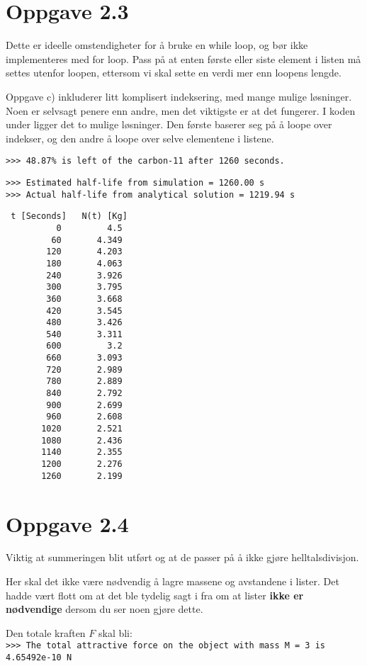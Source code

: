 \documentclass[10pt,a4paper]{article}
\begin{document}
\section*{Oppgave 2.3}

Dette er ideelle omstendigheter for å bruke en while loop, og bør ikke implementeres med for loop. Pass på at enten første eller siste element i listen må settes utenfor loopen, ettersom vi skal sette en verdi mer enn loopens lengde. 

Oppgave c) inkluderer litt komplisert indeksering, med mange mulige løsninger. Noen er selvsagt penere enn andre, men det viktigste er at det fungerer. I koden under ligger det to mulige løsninger. Den første baserer seg på å loope over indekser, og den andre å loope over selve elementene i listene.



\begin{verbatim}
>>> 48.87% is left of the carbon-11 after 1260 seconds.
\end{verbatim}

\begin{verbatim}
>>> Estimated half-life from simulation = 1260.00 s
>>> Actual half-life from analytical solution = 1219.94 s
\end{verbatim}


\begin{verbatim}
 t [Seconds]   N(t) [Kg]
          0         4.5
         60       4.349
        120       4.203
        180       4.063
        240       3.926
        300       3.795
        360       3.668
        420       3.545
        480       3.426
        540       3.311
        600         3.2
        660       3.093
        720       2.989
        780       2.889
        840       2.792
        900       2.699
        960       2.608
       1020       2.521
       1080       2.436
       1140       2.355
       1200       2.276
       1260       2.199
\end{verbatim}


\section*{Oppgave 2.4}
Viktig at summeringen blit utført og at de passer på å ikke gjøre helltalsdivisjon. 

Her skal det ikke være nødvendig å lagre massene og avstandene i lister. Det hadde vært flott om at det ble tydelig sagt i fra om at lister \textbf{ikke er nødvendige} dersom du ser noen gjøre dette. 
 
Den totale kraften $F$ skal bli: \\
\texttt{>>> The total attractive force on the object with mass M = 3 is 4.65492e-10 N}
\pagebreak
\end{document}
